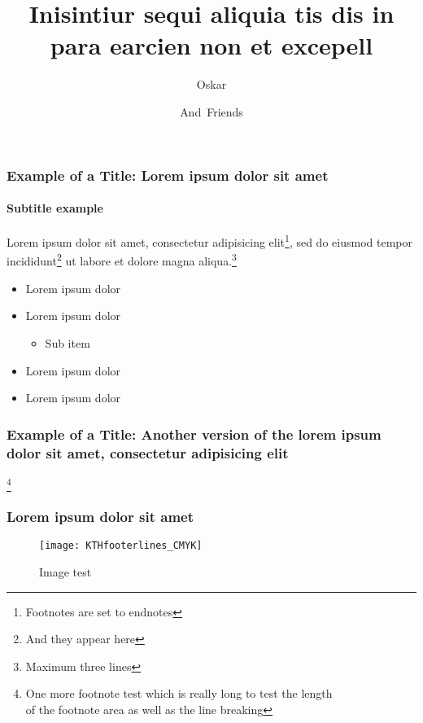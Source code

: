 \documentclass[t]{beamer}
\title[Inisintiur sequi aliquia tis dis in para]
{%
  Inisintiur sequi aliquia tis dis in para earcien non et excepell%
}
\author[Oskar, Friends]
{
Oskar \and
And~Friends
}
\institute{}
\date{}
\begin{document}
\begin{frame}
\titlepage
\end{frame}


\begin{frame}
\frametitle{Example of a Title: Lorem ipsum dolor sit amet}
\framesubtitle{Subtitle example}

Lorem ipsum dolor sit amet, consectetur adipisicing elit\footnote{Footnotes are set to endnotes}, sed do eiusmod tempor incididunt\footnote{And they appear here} ut labore et dolore magna aliqua.\footnote{Maximum three lines}

\begin{itemize}
\item Lorem ipsum dolor
\item Lorem ipsum dolor
\begin{itemize}
\item Sub item
\end{itemize}
\item Lorem ipsum dolor
\item Lorem ipsum dolor
\end{itemize}


\footnoteblock{}

\end{frame}

\begin{frame}
\frametitle{Example of a Title: Another version of the lorem ipsum dolor sit amet, consectetur adipisicing elit}

\lipsum[2]\footnote{One more footnote test which is really long to test the length \\ of the footnote area as well as the line breaking}

\footnoteblock{}

\end{frame}


\begin{frame}
\frametitle{Lorem ipsum dolor sit amet}

\lipsum[4]

\begin{figure}[h!]
\texttt{[image: KTHfooterlines\_CMYK]}
\caption{Image test}
\end{figure}


\end{frame}
\end{document}
